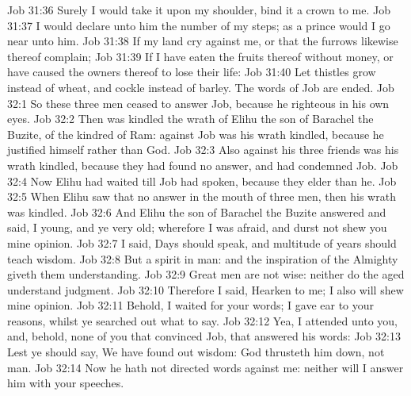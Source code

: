 \vs Job 31:36 Surely I would take it upon my shoulder,  bind it  a crown to me.
\vs Job 31:37 I would declare unto him the number of my steps; as a prince would I go near unto him.
\vs Job 31:38 If my land cry against me, or that the furrows likewise thereof complain;
\vs Job 31:39 If I have eaten the fruits thereof without money, or have caused the owners thereof to lose their life:
\vs Job 31:40 Let thistles grow instead of wheat, and cockle instead of barley. The words of Job are ended.
\vs Job 32:1 So these three men ceased to answer Job, because he  righteous in his own eyes.
\vs Job 32:2 Then was kindled the wrath of Elihu the son of Barachel the Buzite, of the kindred of Ram: against Job was his wrath kindled, because he justified himself rather than God.
\vs Job 32:3 Also against his three friends was his wrath kindled, because they had found no answer, and  had condemned Job.
\vs Job 32:4 Now Elihu had waited till Job had spoken, because they  elder than he.
\vs Job 32:5 When Elihu saw that  no answer in the mouth of  three men, then his wrath was kindled.
\vs Job 32:6 And Elihu the son of Barachel the Buzite answered and said, I  young, and ye  very old; wherefore I was afraid, and durst not shew you mine opinion.
\vs Job 32:7 I said, Days should speak, and multitude of years should teach wisdom.
\vs Job 32:8 But  a spirit in man: and the inspiration of the Almighty giveth them understanding.
\vs Job 32:9 Great men are not  wise: neither do the aged understand judgment.
\vs Job 32:10 Therefore I said, Hearken to me; I also will shew mine opinion.
\vs Job 32:11 Behold, I waited for your words; I gave ear to your reasons, whilst ye searched out what to say.
\vs Job 32:12 Yea, I attended unto you, and, behold,  none of you that convinced Job,  that answered his words:
\vs Job 32:13 Lest ye should say, We have found out wisdom: God thrusteth him down, not man.
\vs Job 32:14 Now he hath not directed  words against me: neither will I answer him with your speeches.
